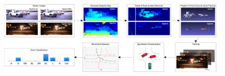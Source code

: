 \begin{figure}[H]
  \centering
  \includegraphics[width=1\textwidth]{text/figures/methods/flowChart.png}
  \label{systemOverview::systemOverview}
\end{figure}
\vspace*{1pt}
%
%
%



